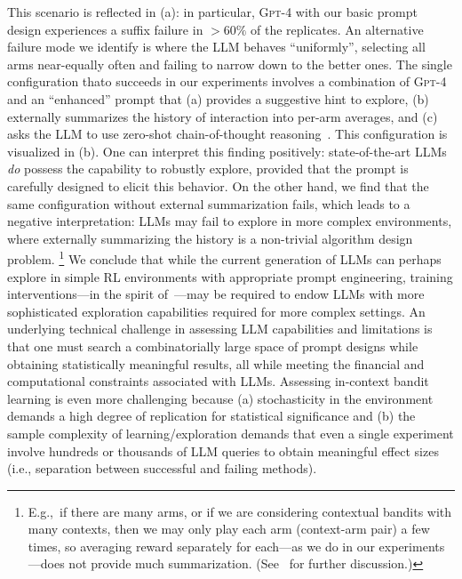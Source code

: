 \documentclass[11pt]{article}
\newcommand{\gptfour}{\textsc{Gpt-4}\xspace}
\newcommand{\xhdr}[1]{\vspace{2mm} \noindent{\bf #1}}
\newcommand{\Eg}{{E.g.,~\xspace}}
\begin{document}
This scenario is reflected in
(a): in particular, \gptfour with our basic prompt design experiences a suffix failure
in $>60\%$ of the replicates.
An alternative failure mode we identify is where the LLM behaves ``uniformly'', selecting all arms near-equally often and failing to narrow down to the better ones.
The single configuration thato succeeds in our experiments involves a
combination of \gptfour and an ``enhanced'' prompt that (a) provides a
suggestive hint to explore, (b) externally summarizes the history of
interaction into per-arm averages,
and (c) asks the LLM to use
zero-shot chain-of-thought reasoning~\citep{wei2022chain,kojima2022large}. This configuration is visualized in
(b).  One can interpret this finding
positively: state-of-the-art LLMs \emph{do} possess the capability to
robustly explore, provided that the prompt is carefully designed to
elicit this behavior. On the other hand, we find that the same
configuration without external summarization fails, which leads to a
negative interpretation: LLMs may fail to explore in more
complex environments, where externally summarizing the history is a non-trivial algorithm design problem.
\footnote{\label{fn:summarization} \Eg if there are many arms, or if we are considering contextual bandits with many contexts, then we may only play each arm (context-arm pair) a few times, so averaging reward separately for each---as we do in our experiments---does not provide much summarization. (See~ for further discussion.)}
We conclude that while the current generation of LLMs can perhaps explore in simple RL environments with appropriate prompt engineering,
training
interventions---in the spirit
of~\citet{lee2023supervised,raparthy2023generalization}---may be
required to endow LLMs with
more sophisticated exploration capabilities required for more complex settings.
\xhdr{Methodology.}  An underlying technical challenge in assessing LLM
capabilities and limitations is that one must search a combinatorially large space of
prompt designs while obtaining statistically meaningful results, all
while meeting the financial and computational constraints associated with
LLMs. Assessing in-context bandit learning
is even more challenging because (a) stochasticity in the environment
demands a high degree of replication for statistical significance and
(b) the sample complexity of learning/exploration demands that even a
single experiment involve hundreds or thousands of LLM queries to obtain meaningful
effect sizes (i.e., separation between successful and failing methods).
\end{document}
